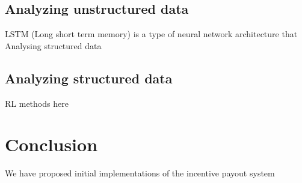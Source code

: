 \documentclass[a4paper]{article}
\begin{document}
\subsection{Analyzing unstructured data}
LSTM (Long short term memory) is a type of neural network architecture that Analysing structured data

\subsection{Analyzing structured data}
RL methods here



\section{Conclusion}
We have proposed initial implementations of the incentive payout system




\end{document}
